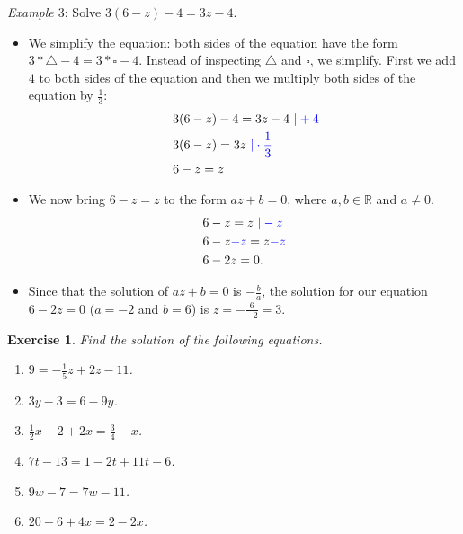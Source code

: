 \documentclass[12pt]{article}
\newtheorem{ex}{Exercise}[section]
\begin{document}
\textit{Example $3$}: Solve $3(6-z)-4=3z-4$.
\begin{itemize}
\item We simplify the equation: both sides of the equation have the form $3*\triangle -4=3*\square -4$. Instead of inspecting $\triangle$ and $\square$, we simplify. First we add $4$ to both sides of the equation and then we multiply both sides of the equation by $\frac{1}{3}$:
\begin{equation*}
\begin{split}
& 3(6-z)-4=3z-4 \textcolor{blue}{\ | +4}\\
& 3(6-z)=3z\textcolor{blue}{\ | \cdot \frac{1}{3}}\\\
& 6-z=z\\
\end{split}
\end{equation*}
\item We now bring $6-z=z$ to the form $az+b=0$, where $a,b\in \mathbb{R}$ and $a\neq 0$.
\begin{equation*}
\begin{split}
& 6-z=z \textcolor{blue}{\ |-z}\\
& 6-z\textcolor{blue}{-z}=z\textcolor{blue}{-z}\\
& 6-2z=0.
\end{split}
\end{equation*}
\item Since that the solution of $az+b=0$ is $-\frac{b}{a}$, the solution for our equation $6-2z=0$ ($a=-2$ and $b=6$) is $z=-\frac{6}{-2}=3$.
\end{itemize}

\begin{ex}
Find the solution of the following equations.
\begin{enumerate}
\item[a)] $9=-\frac{1}{5}z+2z-11$.
\item[b)] $3y-3=6-9y$.
\item[c)] $\frac{1}{2}x-2+2x=\frac{3}{4}-x$.
\item[d)] $7t-13=1-2t+11t-6$.
\item[e)] $9w-7=7w-11$.
\item[f)] $20-6+4x=2-2x$.
\end{enumerate}
\end{ex}
\end{document}
